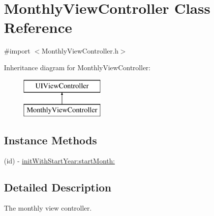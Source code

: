 \hypertarget{interface_monthly_view_controller}{\section{Monthly\+View\+Controller Class Reference}
\label{interface_monthly_view_controller}
}


{\ttfamily \#import $<$Monthly\+View\+Controller.\+h$>$}

Inheritance diagram for Monthly\+View\+Controller\+:\begin{figure}[H]
\begin{center}
\leavevmode
\includegraphics[height=2.000000cm]{interface_monthly_view_controller}
\end{center}
\end{figure}
\subsection*{Instance Methods}
\begin{DoxyCompactItemize}
\item 
(id) -\/ \hyperlink{interface_monthly_view_controller_a84779aaad5a20f68e7b09cf3001d5140}{init\+With\+Start\+Year\+:start\+Month\+:}
\end{DoxyCompactItemize}


\subsection{Detailed Description}
The monthly view controller. 

